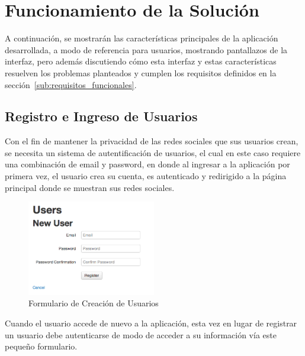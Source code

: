 \chapter{Funcionamiento de la Solución}
\label{chap:funcionamiento_solucion}

A continuación, se mostrarán las características principales de la aplicación desarrollada, a modo de referencia para usuarios, mostrando pantallazos de la interfaz, pero además discutiendo cómo esta interfaz y estas características resuelven los problemas planteados y cumplen los requisitos definidos en la sección~\ref{sub:requisitos_funcionales}.


\section{Registro e Ingreso de Usuarios} %
\label{sec:registro_e_ingreso_de_usuarios}

Con el fin de mantener la privacidad de las redes sociales que sus usuarios crean, se necesita un sistema de autentificación de usuarios, el cual en este caso requiere una combinación de email y password, en donde al ingresar a la aplicación por primera vez, el usuario crea su cuenta, es autenticado y redirigido a la página principal donde se muestran sus redes sociales.

\begin{figure}[H]
  \centering
  \includegraphics[width=0.5\textwidth]{images/creacion_usuario.png}
  \caption{Formulario de Creación de Usuarios}
  \label{creacion_usuario}
\end{figure}

Cuando el usuario accede de nuevo a la aplicación, esta vez en lugar de registrar un usuario debe autenticarse de modo de acceder a su información vía este pequeño formulario.

